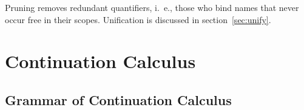 \documentclass{amsart}
\begin{document}
\nc{}

\nc{}

\nc{}

\nc{}

\nc{}

\Tautology

\UniversalNegation

\ExistentialNegation

\SuperIntroduction

\SuperElimination

Pruning removes redundant quantifiers, i.~e., those who bind
names that never occur free in their scopes. Unification is
discussed in section~\ref{sec:unify}.

\UniversalIntroduction

\ExistentialIntroduction

\section{Continuation Calculus}

\subsection{Grammar of Continuation Calculus}

\nc{}
\end{document}
